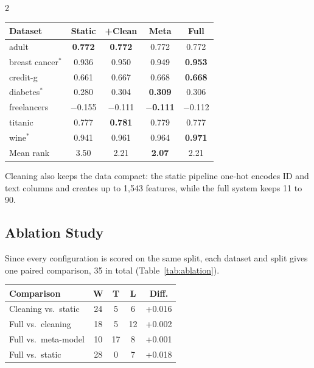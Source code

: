 \documentclass[11pt,a4paper]{article}
\newenvironment{coltable}{\par\medskip\noindent\begin{minipage}{\linewidth}\centering\small}{\end{minipage}\par\medskip}
\begin{document}
\begin{multicols}{2}
\begin{coltable}
\label{tab:results}
\setlength{\tabcolsep}{1.8pt}
\begin{tabular}{lcccc}
\toprule
\textbf{Dataset} & \textbf{Static} & \textbf{+Clean} & \textbf{Meta} & \textbf{Full} \\
\midrule
adult & \textbf{0.772} & \textbf{0.772} & 0.772 & 0.772 \\
breast cancer$^\ast$ & 0.936 & 0.950 & 0.949 & \textbf{0.953} \\
credit-g & 0.661 & 0.667 & 0.668 & \textbf{0.668} \\
diabetes$^\ast$ & 0.280 & 0.304 & \textbf{0.309} & 0.306 \\
freelancers & $-$0.155 & $-$0.111 & \textbf{$-$0.111} & $-$0.112 \\
titanic & 0.777 & \textbf{0.781} & 0.779 & 0.777 \\
wine$^\ast$ & 0.941 & 0.961 & 0.964 & \textbf{0.971} \\
\midrule
Mean rank & 3.50 & 2.21 & \textbf{2.07} & 2.21 \\
\bottomrule
\end{tabular}
\end{coltable}

Cleaning also keeps the data compact: the static pipeline one-hot encodes ID and text columns and creates up to 1,543 features, while the full system keeps 11 to 90.

\subsection{Ablation Study}

Since every configuration is scored on the same split, each dataset and split gives one paired comparison, 35 in total (Table~\ref{tab:ablation}).

\begin{coltable}
\label{tab:ablation}
\setlength{\tabcolsep}{4pt}
\begin{tabular}{lcccc}
\toprule
\textbf{Comparison} & \textbf{W} & \textbf{T} & \textbf{L} & \textbf{Diff.} \\
\midrule
Cleaning vs.\ static & 24 & 5 & 6 & +0.016 \\
Full vs.\ cleaning & 18 & 5 & 12 & +0.002 \\
Full vs.\ meta-model & 10 & 17 & 8 & +0.001 \\
Full vs.\ static & 28 & 0 & 7 & +0.018 \\
\bottomrule
\end{tabular}
\end{coltable}


\end{multicols}
\end{document}
